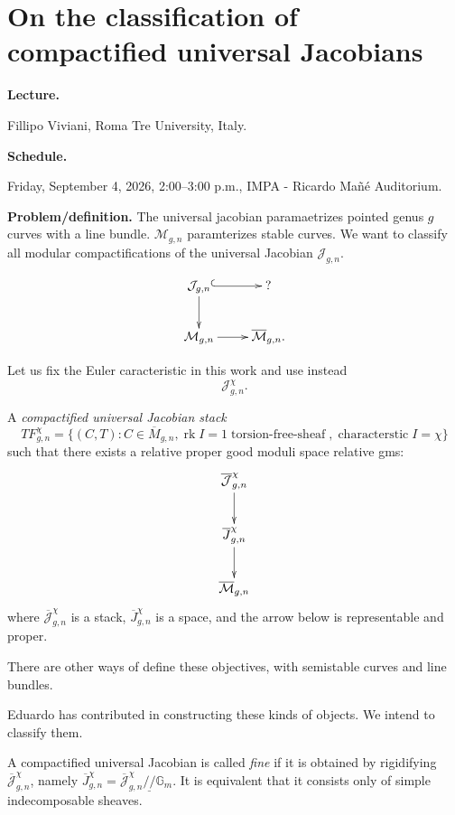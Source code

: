\section{On the classification of
compactified universal Jacobians}
\label{section-compactified-jacobians}

\medskip\noindent
{\bf Lecture.}

Fillipo Viviani,
Roma Tre University, Italy.

\medskip\noindent
{\bf Schedule.}

Friday, September 4, 2026,
2:00--3:00 p.m.,
IMPA - Ricardo Ma\~n\'e Auditorium.

\medskip\noindent
{\bf Problem/definition.}
The universal jacobian paramaetrizes pointed
genus $g$ curves with a line bundle.
$\mathcal{M}_{g,n}$ paramterizes stable
curves.
We want to classify all modular
compactifications of the universal Jacobian
$\mathcal{J}_{g,n}$.

$$
\xymatrix{
\mathcal{J}_{g,n} \ar@{^{(}->}[r]\ar[d]&?\\
\mathcal{M}_{g,n}\ar[r]&
\overline{\mathcal{M}}_{g,n}.
}
$$

Let us fix the Euler caracteristic in this
work and use instead
$$
\mathcal{J}_{g,n}^\chi.
$$

\begin{definition}
\label{definition-compactified-uni-jac-stk}
A {\it compactified universal Jacobian
stack}
$$
TF_{g,n}^{\chi}
=
\{(C,T):C \in \overline{M}_{g,n},
\operatorname{rk}I=1\operatorname{torsion-free-sheaf},\operatorname{characterstic}I=\chi\}
$$
such that there exists a relative proper
good moduli space relative gms:
$$
\xymatrix{
\overline{\mathcal{J}}_{g,n}^{\chi}
\ar[d]\\
\overline{J}_{g,n}^{\chi}\ar[d]\\
\overline{\mathcal{M}}_{g,n}
}
$$
where $\overline{\mathcal{J}}_{g,n}^{\chi}$
is a stack, $\overline{J}_{g,n}^{\chi}$
is a space,
and the arrow below is representable and
proper.
\end{definition}

\noindent
\begin{remark}
\label{remark-other-ways}
There are other ways of define these
objectives, with semistable curves and line
bundles.
\end{remark}

\noindent
Eduardo has contributed in constructing
these kinds of objects.
We intend to classify them.

\medskip\noindent
\begin{definition}
\label{definition-fine}
A compactified universal Jacobian
is called {\it fine}
if it is obtained by rigidifying
$\overline{\mathcal{J}}_{g,n}^{\chi}$,
namely
$\overline{J}_{g,n}^{\chi}=
\overline{\mathcal{J}}_{g,n}^{\chi}\underline{//}
\mathbb{G}_m$.
It is equivalent that it consists
only of simple indecomposable sheaves.
\end{definition}

